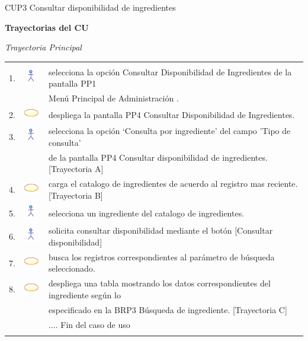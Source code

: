 \documentclass[10pt,spanish]{article}
\providecommand{\tabularnewline}{\\}
\begin{document}
\begin{table}[!ht]
	\caption{CUP3 Consultar disponibilidad de ingredientes}
	\label{tab:CasosdeUso:nombredecasodeuso} 
	\end{table}
	\newpage
	\textbf{\large Trayectorias del CU}{\large \par}
	\textit{\large Trayectoria Principal}{\large{} }{\large \par}
	\begin{tabular}{ccl}
	 &  & \tabularnewline
	1. & \includegraphics{actor} & selecciona la opción Consultar Disponibilidad de Ingredientes de la pantalla PP1\tabularnewline	
    & & Menú Principal de Administración .\tabularnewline	
	2. & \includegraphics{sistema} & despliega la pantalla PP4 Consultar Disponibilidad de Ingredientes.\tabularnewline			 	 
	3. & \includegraphics{actor} & selecciona la opción ‘Consulta por ingrediente’ del campo 'Tipo de consulta' \tabularnewline
	& &  de la pantalla PP4 Consultar disponibilidad de ingredientes. [Trayectoria A]\tabularnewline
	4. & \includegraphics{sistema} &  carga el catalogo de ingredientes de acuerdo al registro mas reciente.[Trayectoria B]\tabularnewline
	5. & \includegraphics{actor} &  selecciona un ingrediente del catalogo de ingredientes.\tabularnewline
	6. & \includegraphics{actor} & solicita consultar disponibilidad mediante el botón [Consultar disponibilidad]\tabularnewline 
	7. & \includegraphics{sistema} & busca los registros correspondientes al parámetro de búsqueda seleccionado. \tabularnewline
	8. & \includegraphics{sistema} & despliega una tabla mostrando los datos correspondientes del ingrediente según lo\tabularnewline
	& & especificado en la BRP3 Búsqueda de ingrediente. [Trayectoria C]\tabularnewline
	 &  & .... Fin del caso de uso\tabularnewline \\
	\end{tabular}
\end{document}
